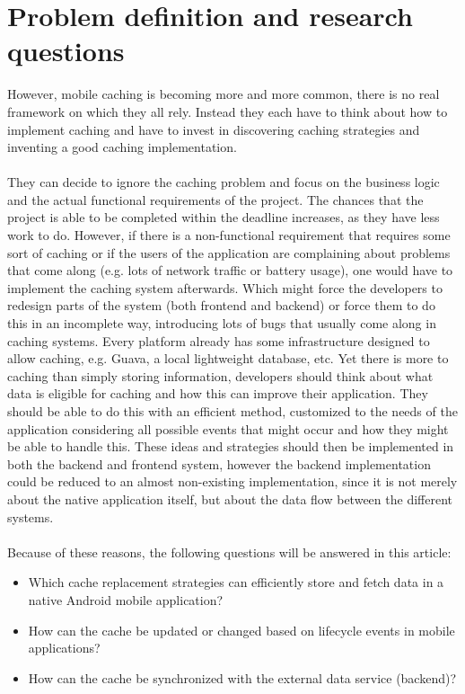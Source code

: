 \documentclass[pdftex,a4paper,12pt,twoside]{report}
\begin{document}
\section{Problem definition and research questions}
However, mobile caching is becoming more and more common, there is no real framework on which they all rely. Instead they each have to think about how to implement
caching and have to invest in discovering caching strategies and inventing a good caching implementation.
\\\\
They can decide to ignore the caching problem and focus on the business logic and the actual functional requirements of the project. The chances that the
project is able to be completed within the deadline increases, as they have less work to do. However, if there is a non-functional requirement that requires some sort of caching
or if the users of the application are complaining about problems that come along (e.g. lots of network traffic or battery usage), one would have to implement the caching system afterwards. Which might force the developers to redesign parts of the system (both frontend and backend) or force them to do this in an incomplete way, introducing lots of bugs that usually come along in caching systems.
\label{sec:research questions}
Every platform already has some infrastructure designed to allow caching, e.g. Guava, a local lightweight database, etc.
Yet there is more to caching than simply storing information, developers should think about what data is eligible for caching and how this can improve their application.
They should be able to do this with an efficient method, customized to the needs of the application considering all possible events that might occur and how they might be able to handle this. These ideas and strategies should then be implemented in both the backend and frontend system, however the backend implementation could be reduced to an almost non-existing implementation, since it is not merely about the native application itself, but about the data flow between the different systems.
\\\\Because of these reasons, the following questions will be answered in this article:
\begin{itemize}
\item Which cache replacement strategies can efficiently store and fetch data in a native Android mobile application?
\item How can the cache be updated or changed based on lifecycle events in mobile applications?
\item How can the cache be synchronized with the external data service (backend)?
\end{itemize}
\end{document}

